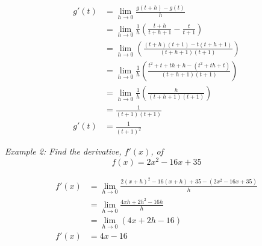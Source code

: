 \documentclass{article}
\begin{document}
            \begin{align*}
                g'(t) &= \lim_{h\to 0} \frac{g(t+h)-g(t)}{h} \\
                &= \lim_{h\to 0} \frac{1}{h}\left(\frac{t+h}{t+h+1}-\frac{t}{t+1}\right) \\
                &= \lim_{h\to 0}\left(\frac{(t+h)(t+1)-t(t+h+1)}{(t+h+1)(t+1)}\right) \\
                &= \lim_{h\to 0} \frac{1}{h}\left(\frac{t^2+t+th+h-(t^2+th+t)}{(t+h+1)(t+1)}\right) \\
                &= \lim_{h\to 0} \frac{1}{h} \left(\frac{h}{(t+h+1)(t+1)}\right) \\
                &= \frac{1}{(t+1)(t+1)} \\
                g'(t) &= \frac{1}{(t+1)^2}
            \end{align*}

            \noindent \color{blue} \textit{Example 2: Find the derivative, $f'(x)$, of } \\

            \begin{equation*}
                f(x) = 2x^2-16x+35
            \end{equation*} \color{black}

            \begin{align*}
                f'(x) &= \lim_{h\to 0} \frac{2(x+h)^2-16(x+h)+35-(2x^2-16x+35)}{h} \\
                &= \lim_{h\to 0} \frac{4xh+2h^2-16h}{h} \\
                &= \lim_{h\to 0} (4x+2h-16) \\
                f'(x) &= 4x-16
            \end{align*}
\end{document}
